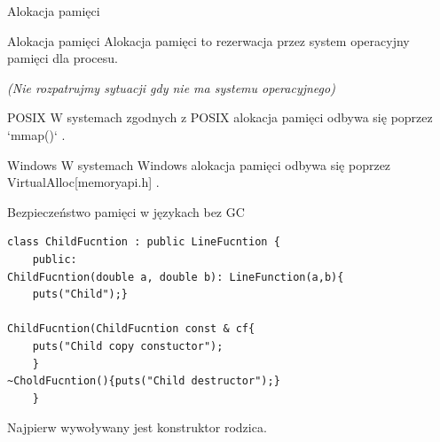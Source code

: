 \documentclass{beamer}
\begin{document}




    


\begin{frame}{Alokacja pamięci}
    \begin{block}{Alokacja pamięci}
        Alokacja pamięci to rezerwacja przez system operacyjny pamięci dla procesu\cite{mmap-linux_man, virtual-alloc}.
        
        \textit{(Nie rozpatrujmy sytuacji gdy nie ma systemu operacyjnego)}
    \end{block}
    \begin{block}{POSIX}
        W systemach zgodnych z POSIX alokacja pamięci odbywa się poprzez  `mmap()` \cite{mmap-linux_man}.
    \end{block}

    \begin{block}{Windows}
        W systemach Windows alokacja pamięci odbywa się poprzez VirtualAlloc[memoryapi.h] \cite{virtual-alloc}.
    \end{block}
\end{frame}

\begin{frame}[containsverbatim]{Bezpieczeństwo pamięci w językach bez GC}
\begin{verbatim}
class ChildFucntion : public LineFucntion { 
    public:
ChildFucntion(double a, double b): LineFunction(a,b){
    puts("Child");}
    
ChildFucntion(ChildFucntion const & cf{
    puts("Child copy constuctor");
    }
~CholdFucntion(){puts("Child destructor");}
    }
\end{verbatim}
\begin{block}{}
    Najpierw wywoływany jest konstruktor rodzica.
\end{block}
\end{frame}
\end{document}
